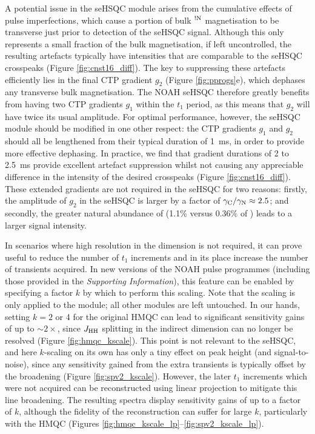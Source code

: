 \documentclass[11pt]{article}
\newcommand*{\hl}[1]{\textcolor{WildStrawberry}{#1}}
\newcommand*{\carbon}{\ce{^{13}C}}
\newcommand*{\nitrogen}{\ce{^{15}N}}
\newcommand*{\magnnot}[1]{\ce{^1H}$^{!#1}$}
\newcommand*{\jhh}{J_{\ce{HH}}}
\newcommand*{\figref}[1]{Figure \ref{fig:#1}}
\newcommand*{\SInf}{\textit{Supporting Information}}
\begin{document}
\hl{
A potential issue in the \nitrogen{} seHSQC module arises from the cumulative effects of pulse imperfections, which cause a portion of bulk \magnnot{\ce{N}} magnetisation to be transverse just prior to detection of the seHSQC signal.
Although this only represents a small fraction of the bulk magnetisation, if left uncontrolled, the resulting artefacts typically have intensities that are comparable to the seHSQC crosspeaks (\figref{cnst16_diff}).
The key to suppressing these artefacts efficiently lies in the final CTP gradient $g_2$ (\figref{pprogs}e), which dephases any transverse bulk magnetisation.
The NOAH seHSQC therefore greatly benefits from having two CTP gradients $g_1$ within the $t_1$ period, as this means that $g_2$ will have twice its usual amplitude.
For optimal performance, however, the \nitrogen{} seHSQC module should be modified in one other respect: the CTP gradients $g_1$ and $g_2$ should all be lengthened from their typical duration of \SI{1}{\ms}, in order to provide more effective dephasing.
In practice, we find that gradient durations of 2 to \SI{2.5}{\ms} provide excellent artefact suppression whilst not causing any appreciable difference in the intensity of the desired crosspeaks (\figref{cnst16_diff}).
These extended gradients are not required in the \carbon{} seHSQC for two reasons: firstly, the amplitude of $g_2$ in the \carbon{} seHSQC is larger by a factor of $\gamma_{\ce{C}}/\gamma_{\ce{N}} \approx 2.5$; and secondly, the greater natural abundance of \carbon{} (1.1\% versus 0.36\% of \nitrogen{}) leads to a larger signal intensity.
}

In scenarios where high resolution in the \nitrogen{} dimension is not required, it can prove useful to reduce the number of $t_1$ increments and in its place increase the number of transients acquired.\autocite{Perez-Trujillo2007MRC, Parella2010CMR}
In new versions of the NOAH pulse programmes (including those provided in the \SInf{}), this feature can be enabled by specifying a factor $k$ by which to perform this scaling.
Note that the scaling is only applied to the \nitrogen{} module; all other modules are left untouched.
In our hands, setting $k = 2$ or 4 for the original \nitrogen{} HMQC can lead to significant sensitivity gains of up to $\sim 2\times$, since $\jhh$ splitting in the indirect dimension can no longer be resolved (\figref{hmqc_kscale}).
This point is not relevant to the seHSQC, and here $k$-scaling on its own has only a tiny effect on peak height (and signal-to-noise), since any sensitivity gained from the extra transients is typically offset by the broadening (\figref{spv2_kscale}).
However, the later $t_1$ increments which were not acquired can be reconstructed using linear projection\autocite{linearpred} to mitigate this line broadening.
The resulting spectra display sensitivity gains of up to a factor of $k$, although the fidelity of the reconstruction can suffer for large $k$, particularly with the HMQC (Figures \ref{fig:hmqc_kscale_lp}--\ref{fig:spv2_kscale_lp}).
\end{document}
